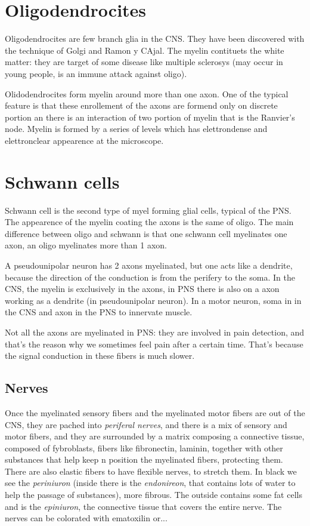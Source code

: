 \documentclass[a4paper, 12pt]{book}
\begin{document}
\section{Oligodendrocites}
Oligodendrocites are few branch glia in the CNS. They have been discovered with the technique of Golgi and Ramon y CAjal. The myelin contituets the white matter: they are target of some disease like multiple sclerosys (may occur in young people, is an immune attack against oligo).

Olidodendrocites form myelin around more than one axon. One of the typical feature is that these enrollement of the axons are formend only on discrete portion an there is an interaction of two portion of myelin that is the Ranvier's node. Myelin is formed by a series of levels which has elettrondense and elettronclear appearence at the microscope. 

\section{Schwann cells}
Schwann cell is the second type of myel forming glial cells, typical of the PNS. The appearence of the myelin coating the axons is the same of oligo. The main difference between oligo and schwann is that one schwann cell myelinates one axon, an oligo myelinates more than 1 axon.

A pseudounipolar neuron has 2 axons myelinated, but one acts like a dendrite, because the direction of the conduction is from the perifery to the soma. In the CNS, the myelin is exclusively in the axons, in PNS there is also on a axon working as a dendrite (in pseudounipolar neuron). In a motor neuron, soma in in the CNS and axon in the PNS to innervate muscle.

Not all the axons are myelinated in PNS: they are involved in pain detection, and that's the reason why we sometimes feel pain after a certain time. That's because the signal conduction in these fibers is much slower. 
\subsection{Nerves}
Once the myelinated sensory fibers and the myelinated motor fibers are out of the CNS, they are pached into \emph{periferal nerves}, and there is a mix of sensory and motor fibers, and they are surrounded by a matrix composing a connective tissue, composed of fybroblasts, fibers like fibronectin, laminin, together with other substances that help keep n position the myelinated fibers, protecting them. There are also elastic fibers to have flexible nerves, to stretch them. In black we see the \emph{periniuron} (inside there is the \emph{endonireon}, that contains lots of water to help the passage of substances), more fibrous. The outside contains some fat cells and is the \emph{epiniuron}, the connective tissue that covers the entire nerve. The nerves can be colorated with ematoxilin or...
\end{document}
